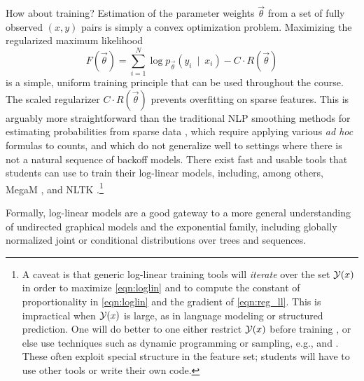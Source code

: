 \documentclass[11pt,letterpaper]{article}
\DeclareMathOperator*{\argmax}{arg\,max}
\begin{document}
How about training?  Estimation of the parameter weights
$\vec{\theta}$ from a set of fully observed $(x,y)$ pairs is simply a
convex optimization problem.  Maximizing the regularized maximum
likelihood
\begin{equation}\label{eqn:reg_ll}
  F\left(\vec{\theta}\right) = \sum_{i=1}^N \log{p_{\vec{\theta}}\left(y_i\ \mid\ x_i\right)} - C \cdot R\left(\vec{\theta}\right)
\end{equation}
is a simple, uniform training principle that can be used throughout
the course.  The scaled regularizer $C\cdot R(\vec{\theta})$
prevents overfitting on sparse features.
This is arguably more straightforward than the traditional NLP
smoothing methods for estimating probabilities from sparse data
\cite{chen-goodman-1996}, which require applying various {\em ad hoc}
formulas to counts, and which do not generalize well to settings where
there is not a natural sequence of backoff models.  There exist 
fast and usable tools that students can use to train their log-linear
models, including, among others, MegaM \cite{daume04cg-bfgs}, 
and NLTK \cite{bird2009natural}.\footnote{\label{fn:bigY}A caveat is that generic
  log-linear training tools will {\em iterate} over the set ${\cal
    Y}(x)$ in order to maximize
  \eqref{eqn:loglin} and to compute the constant of proportionality
  in \eqref{eqn:loglin} and the gradient of
  \eqref{eqn:reg_ll}.  This is impractical when ${\cal Y}(x)$ is large, as in
  language modeling or structured prediction.  One will do better to
 one either restrict ${\cal Y}(x)$ before training
\cite{johnson-et-al-1999}, or else use techniques such as dynamic
programming or sampling, e.g., 
\cite{lafferty-mccallum-pereira-2001} and \cite{rosenfeld-chen-zhu-2001}. 
These often exploit special
structure in the feature set; students will have to use other tools or 
write their own code.}
%

Formally, log-linear models are a good gateway to a more general
understanding of undirected graphical models and the exponential
family, including globally normalized joint or conditional
distributions over trees and sequences.
\end{document}

